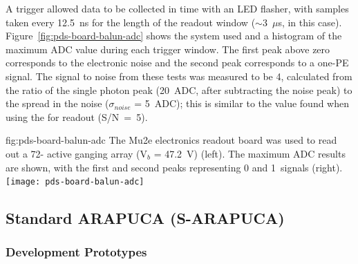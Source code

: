 
A trigger allowed data to be collected in time with an LED flasher, with samples taken every 12.5~ns for the length of the readout window ($\sim$3~$\mu$s, in this case). Figure~\ref{fig:pds-board-balun-adc} shows the system used and a histogram of the maximum ADC value during each trigger window. The first peak above zero corresponds to the electronic noise and the second peak corresponds to a one-PE signal. The signal to noise from these tests was measured to be 4, calculated from the ratio of the single photon peak (20~ADC, after subtracting the noise peak) to the spread in the noise ($\sigma_{noise}$ = 5~ADC); this is similar to the value found when using the  for readout (S/N~=~5).

\begin{dunefigure}
{fig:pds-board-balun-adc}
{The Mu2e electronics readout board was used to read out a 72- active ganging array (V$_b$ = \SI{47.2}{V}) (left). The maximum ADC results are shown, with the first and second peaks representing 0 and 1~\phel signals (right).}
\texttt{[image: pds-board-balun-adc]} 
\vspace{-7.0cm}
\end{dunefigure}


\subsection{Standard ARAPUCA (S-ARAPUCA)}
\label{sec:sarapuca-prototypes}


\subsubsection{Development Prototypes}
\label{sec:valid-initial}

